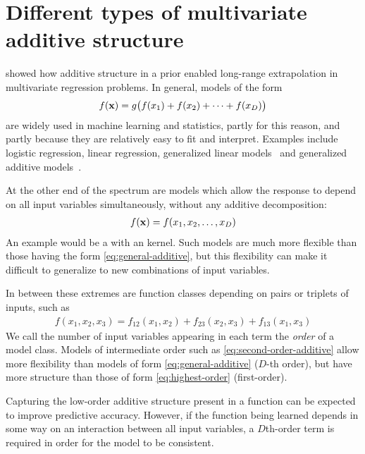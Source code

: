\section{Different types of multivariate additive {\mbox structure}}
 showed how additive structure in a \gp{} prior enabled long-range extrapolation in multivariate regression problems.
In general, models of the form
%
\begin{align}
f({\bf{x}}) = g \big( f(x_1) + f(x_2) + \dots + f(x_D) \big)
\label{eq:general-additive}
\end{align}
%
are widely used in machine learning and statistics, partly for this reason, and partly because they are relatively easy to fit and interpret.
Examples include logistic regression, linear regression, generalized linear models~\citep{nelder1972generalized} and generalized additive models~\citep{hastie1990generalized}.

At the other end of the spectrum are models which allow the response to depend on all input variables simultaneously, without any additive decomposition:
%
\begin{align}
f({\bf{x}}) = f(x_1, x_2, \dots, x_D)
\label{eq:highest-order}
\end{align}
%
An example would be a \gp{} with an \seard{} kernel.
Such models are much more flexible than those having the form \eqref{eq:general-additive}, but this flexibility can make it difficult to generalize to new combinations of input variables.

In between these extremes are function classes depending on pairs or triplets of inputs, such as
%
\begin{align}
f(x_1, x_2, x_3) = f_{12}(x_1, x_2) + f_{23}(x_2, x_3) + f_{13}(x_1, x_3)
\label{eq:second-order-additive}
\end{align}
%
We call the number of input variables appearing in each term the \emph{order} of a model class.
Models of intermediate order such as \eqref{eq:second-order-additive} allow more flexibility than models of form \eqref{eq:general-additive} ($D$-th order), but have more structure than those of form \eqref{eq:highest-order} (first-order).

Capturing the low-order additive structure present in a function can be expected to improve predictive accuracy.
However, if the function being learned depends in some way on an interaction between all input variables, a $D$th-order term is required in order for the model to be consistent.

